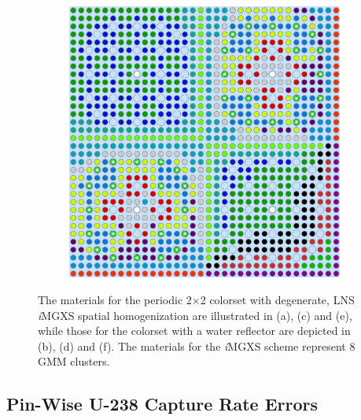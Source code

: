 \documentclass[12pt,twoside]{mitthesis-exec}
\begin{document}
\begin{figure}[h!]
\begin{subfigure}{0.47\textwidth}
  \caption{}
  \label{fig:2x2-8-clusters}
\end{subfigure}%
\begin{subfigure}{0.47\textwidth}
  \centering
  \includegraphics[width=0.7\linewidth]{figures/unsupervised/geometries/with-features/8-clusters/combined/reflector}
  \caption{}
  \label{fig:reflector-8-clusters}
\end{subfigure}
\caption[Materials for the 2$\times$2 colorsets]{The materials for the periodic 2$\times$2 colorset with degenerate, LNS \textit{i}MGXS spatial homogenization are illustrated in (a), (c) and (e), while those for the colorset with a water reflector are depicted in (b), (d) and (f). The materials for the \textit{i}MGXS scheme represent 8 GMM clusters.}
\label{fig:colorset-geometries}
\end{figure}

\clearpage

\subsection*{Pin-Wise U-238 Capture Rate Errors}
\end{document}
